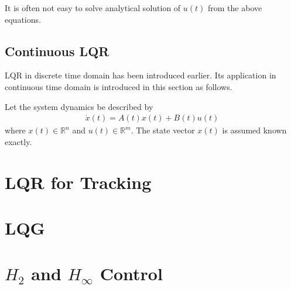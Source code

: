 It is often not easy to solve analytical solution of $u(t)$ from the above equations.

\subsection{Continuous LQR}

LQR in discrete time domain has been introduced earlier. Its application in continuous time domain is introduced in this section as follows.

Let the system dynamics be described by
\begin{eqnarray}
	\dot{x}(t) = A(t)x(t) + B(t)u(t) \nonumber
\end{eqnarray}
where $x(t)\in\mathbb{R}^n$ and $u(t)\in\mathbb{R}^m$. The state vector $x(t)$ is assumed known exactly.











\section{LQR for Tracking}

\section{LQG}

\section{$H_2$ and $H_\infty$ Control} 